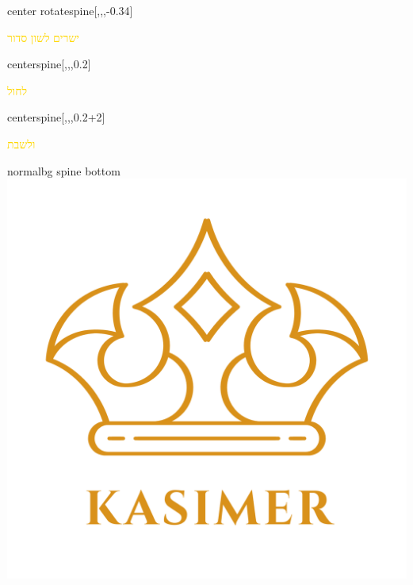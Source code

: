 \documentclass[
coverheight=8.5in,
coverwidth=5.5in,
spinewidth=.659in,
bleedwidth=.125in,
marklength=0in,
12pt,
pagecolor=black,
]{bookcover}
\newcommand{\hebtext}[1]{
\begin{hebrew}
	#1
\end{hebrew}
}
\begin{document}
	\begin{bookcover}
	\begin{bookcoverelement}{center rotate}{spine}[,,,-0.34\coverheight]
		\LARGE\textcolor{gold}{\hebtext{ישרים לשון סדור} }
	\end{bookcoverelement}
	\begin{bookcoverelement}{center}{spine}[,,,0.2\coverheight]
	\textcolor{gold}{\hebtext{לחול}}
	\end{bookcoverelement}
	\begin{bookcoverelement}{center}{spine}[,,,0.2\coverheight+2\baselineskip]
	\textcolor{gold}{\hebtext{ולשבת}}
	\end{bookcoverelement}
	\begin{bookcoverelement}{normal}{bg spine bottom}
		\includegraphics[width=0.8\spinewidth,height=0.8\spinewidth]{kasimer_logo.png}
	\end{bookcoverelement}
		


\end{bookcover}
\end{document}
